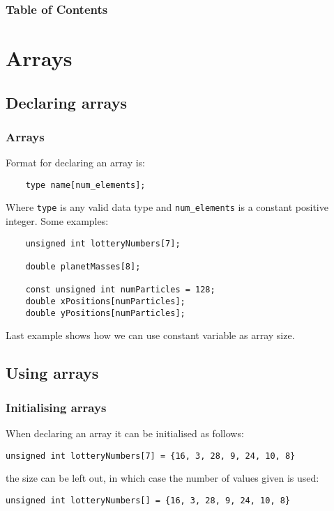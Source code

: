 \documentclass{beamer}
\subtitle{Session 2: More data types}
\begin{document}
\frame{\titlepage}

\begin{frame}
\frametitle{Table of Contents}
\tableofcontents
\end{frame}


\section{Arrays}

\subsection{Declaring arrays}

\begin{frame}[fragile]
	\frametitle{Arrays}
	
	
	Format for declaring an array is:
	\begin{lstlisting}
	type name[num_elements];
	\end{lstlisting}
	Where \texttt{type} is any valid data type and \texttt{num\_elements} is a constant positive integer.
	\pause
	Some examples:
	\begin{lstlisting}
	unsigned int lotteryNumbers[7];
	
	double planetMasses[8];
	
	const unsigned int numParticles = 128;
	double xPositions[numParticles];
	double yPositions[numParticles];
	\end{lstlisting}
	Last example shows how we can use constant variable as array size.
	
\end{frame}

\subsection{Using arrays}

\begin{frame}[fragile]
  \frametitle{Initialising arrays}
  When declaring an array it can be initialised as follows:
  \begin{lstlisting}
unsigned int lotteryNumbers[7] = {16, 3, 28, 9, 24, 10, 8}
  \end{lstlisting}
  the size can be left out, in which case the number of values given is used:
  \begin{lstlisting}
unsigned int lotteryNumbers[] = {16, 3, 28, 9, 24, 10, 8}
  \end{lstlisting}  
\end{frame}
\end{document}
